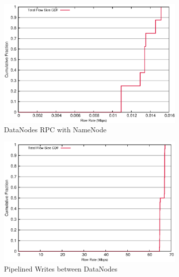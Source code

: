 \begin{figure}[!htpb]
\centering
  \begin{subfigure}[b]{.45\linewidth}
   \centering
	\includegraphics[width=.99\textwidth]{figures/replica_change/24_28_flow_size.eps} 
	\caption{DataNodes RPC with NameNode}\label{fig:replica_size:rpc}
   \end{subfigure}%
  \begin{subfigure}[b]{.45\linewidth}
   \centering
	\includegraphics[width=.99\textwidth]{figures/replica_change/36_32_flow_size.eps} 
	\caption{Pipelined Writes between DataNodes}\label{fig:replica_size:pipe_write}
   \end{subfigure} \\%
  \begin{subfigure}[b]{.55\linewidth}
   \centering

\end{subfigure}
\end{figure}
